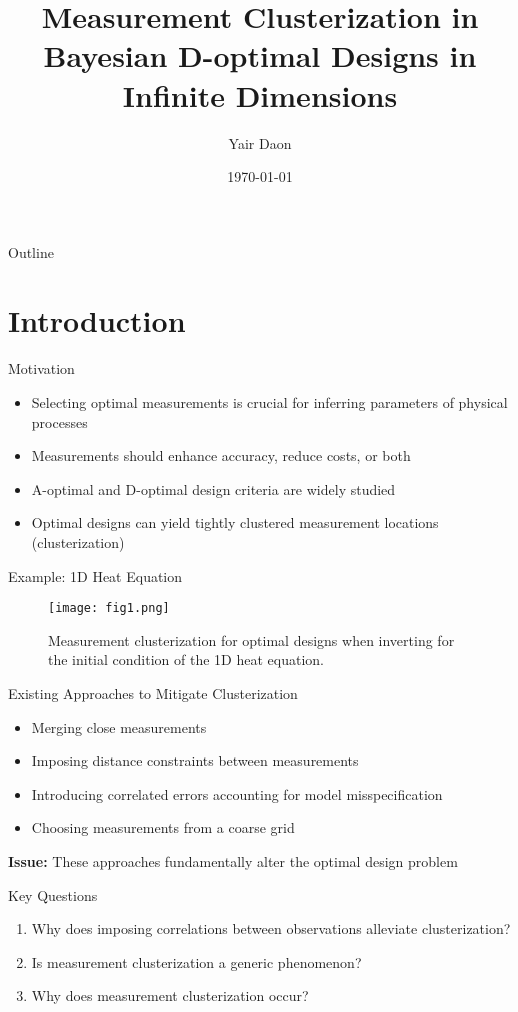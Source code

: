 \documentclass[aspectratio=169]{beamer}
\title{Measurement Clusterization in Bayesian D-optimal Designs in Infinite Dimensions}
\author{Yair Daon}
\institute{Azrieli Faculty of Medicine, Bar-Ilan University}
\date{\today}
\begin{document}
\begin{frame}
\titlepage
\end{frame}

\begin{frame}{Outline}
\tableofcontents
\end{frame}

\section{Introduction}

\begin{frame}{Motivation}
\begin{itemize}
    \item Selecting optimal measurements is crucial for inferring parameters of physical processes
    \item Measurements should enhance accuracy, reduce costs, or both
    \item A-optimal and D-optimal design criteria are widely studied
    \item Optimal designs can yield tightly clustered measurement locations (clusterization)
\end{itemize}
\end{frame}

\begin{frame}{Example: 1D Heat Equation}
\begin{figure}
    \centering
    \texttt{[image: fig1.png]}
    \caption{Measurement clusterization for optimal designs when inverting for the initial condition of the 1D heat equation.}
\end{figure}
\end{frame}

\begin{frame}{Existing Approaches to Mitigate Clusterization}
\begin{itemize}
    \item Merging close measurements
    \item Imposing distance constraints between measurements 
    \item Introducing correlated errors accounting for model misspecification
    \item Choosing measurements from a coarse grid
\end{itemize}
\textbf{Issue:} These approaches fundamentally alter the optimal design problem
\end{frame}

\begin{frame}{Key Questions}
\begin{enumerate}
    \item Why does imposing correlations between observations alleviate clusterization?
    \item Is measurement clusterization a generic phenomenon? 
    \item Why does measurement clusterization occur?
\end{enumerate}
\end{frame}
\end{document}
